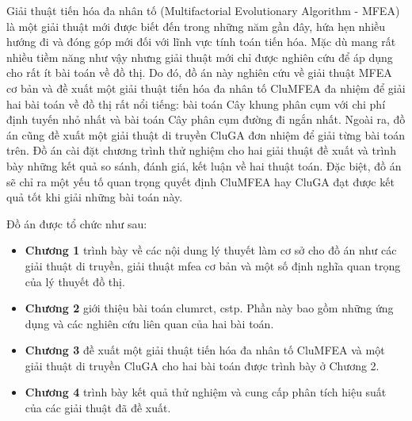 \fontsize{12}{16}\selectfont
\glsresetall

Giải thuật tiến hóa đa nhân tố (Multifactorial Evolutionary Algorithm - MFEA) là một giải thuật mới được biết đến trong những năm gần đây, hứa hẹn nhiều hướng đi và đóng góp mới đối với lĩnh vực tính toán tiến hóa. Mặc dù mang rất nhiều tiềm năng như vậy nhưng giải thuật mới chỉ được nghiên cứu để áp dụng cho rất ít bài toán về đồ thị. Do đó, đồ án này nghiên cứu về giải thuật MFEA cơ bản và đề xuất một giải thuật tiến hóa đa nhân tố CluMFEA đa nhiệm để giải hai bài toán về đồ thị rất nổi tiếng: bài toán Cây khung phân cụm với chi phí định tuyến nhỏ nhất và bài toán Cây phân cụm đường đi ngắn nhất. Ngoài ra, đồ án cũng đề xuất một giải thuật di truyền CluGA đơn nhiệm để giải từng bài toán trên. Đồ án cài đặt chương trình thử nghiệm cho hai giải thuật đề xuất và trình bày những kết quả so sánh, đánh giá, kết luận về hai thuật toán. Đặc biệt, đồ án sẽ chỉ ra một yếu tố quan trọng quyết định CluMFEA hay CluGA đạt được kết quả tốt khi giải những bài toán này.

Đồ án được tổ chức như sau:
\begin{itemize}
	\item \textbf{Chương 1} trình bày về các nội dung lý thuyết làm cơ sở cho đồ án như các giải thuật di truyền, giải thuật \gls{mfea} cơ bản và một số định nghĩa quan trọng của lý thuyết đồ thị.
	\item \textbf{Chương 2} giới thiệu bài toán  \gls{clumrct}, \gls{cstp}. Phần này bao gồm  những ứng dụng và các nghiên cứu liên quan của hai bài toán.
	\item \textbf{Chương 3} đề xuất một giải thuật tiến hóa đa nhân tố CluMFEA và một giải thuật di truyền CluGA cho hai bài toán được trình bày ở Chương 2.
	\item \textbf{Chương 4} trình bày kết quả thử nghiệm và cung cấp phân tích hiệu suất của các giải thuật đã đề xuất.
\end{itemize}
